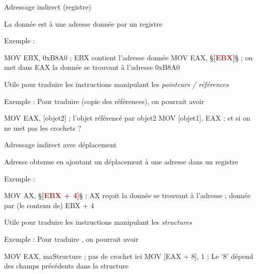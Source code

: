 \documentclass[14pt]{beamer}
\begin{document}
\begin{frame}[fragile]{Adressage indirect (registre)}

La donnée est à une adresse donnée par un registre

\bigskip
Exemple :
\begin{Asm}
	MOV EBX, 0xB8A0      ; EBX contient l'adresse donnée
	MOV EAX, §\textcolor{brown}{\textbf{[EBX]}}§      ; on met dans EAX la donnée se trouvant à l'adresse 0xB8A0
\end{Asm}

\bigskip
Utile pour traduire les instructions manipulant les \emph{pointeurs / références}

\bigskip
Exemple : Pour traduire  (copie des références), 
on pourrait avoir
\begin{Asm}
	MOV EAX, [objet2]      ; l'objet référencé par objet2
	MOV [objet1], EAX      ; et si on ne met pas les crochets ?
\end{Asm}
\end{frame}

\begin{frame}[fragile]{Adressage indirect avec déplacement}

Adresse obtenue en ajoutant un déplacement à une adresse dans un registre

\bigskip
Exemple :
\begin{Asm}
	MOV AX, §\textcolor{brown}{\textbf{[EBX + 4]}}§    ; AX reçoit la donnée se trouvant à l'adresse
	                      ; donnée par (le contenu de) EBX + 4
\end{Asm}

\bigskip
Utile pour traduire les instructions manipulant les \emph{structures}

\bigskip
Exemple : Pour traduire , on pourrait avoir
\begin{Asm}
	MOV EAX, maStructure   ; pas de crochet ici 
	MOV [EAX + 8], 1        ; Le '8' dépend des champs précédents dans la structure 
\end{Asm}
\end{frame}
\end{document}
